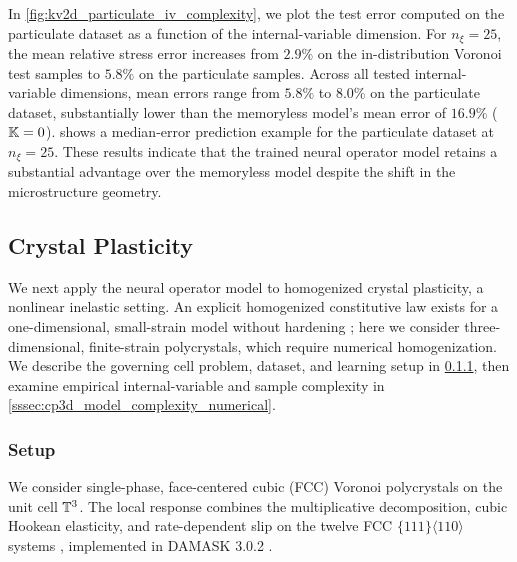 \documentclass[3p, 12pt, preprint]{elsarticle}
\begin{document}
In \cref{fig:kv2d_particulate_iv_complexity}, we plot the test error computed on the particulate dataset as a function of the internal-variable dimension. For $n_{\xi}=25$, the mean relative stress error increases from $2.9\%$ on the in-distribution Voronoi test samples to $5.8\%$ on the particulate samples. Across all tested internal-variable dimensions, mean errors range from $5.8\%$ to $8.0\%$ on the particulate dataset, substantially lower than the memoryless model's mean error of $16.9\%$ ($\mathbb{K}=0$).  shows a median-error prediction example for the particulate dataset at $n_{\xi}=25$. These results indicate that the trained neural operator model retains a substantial advantage over the memoryless model despite the shift in the microstructure geometry.

\subsection{Crystal Plasticity}\label{subsec:3d_crystal_plasticity}
{We next apply the neural operator model to homogenized crystal plasticity, a nonlinear inelastic setting. An explicit homogenized constitutive law exists for a one-dimensional, small-strain model without hardening \cite{liu2023learning,bhattacharya2025learning}; here we consider three-dimensional, finite-strain polycrystals, which require numerical homogenization. We describe the governing cell problem, dataset, and learning setup in \cref{sssec:cp3d_setup}, then examine empirical internal-variable and sample complexity in \cref{sssec:cp3d_model_complexity_numerical}.}

\subsubsection{Setup}\label{sssec:cp3d_setup}
We consider single-phase, face-centered cubic (FCC) Voronoi polycrystals on the unit cell $\mathbb{T}^3$. {\color{blue}The local response combines the multiplicative decomposition, cubic Hookean elasticity, and rate-dependent slip on the twelve FCC $\{111\}\langle110\rangle$ systems \cite{asaro1983crystal,roters2010overview}}, implemented in DAMASK 3.0.2 \cite{roters2019damask}.
\end{document}
